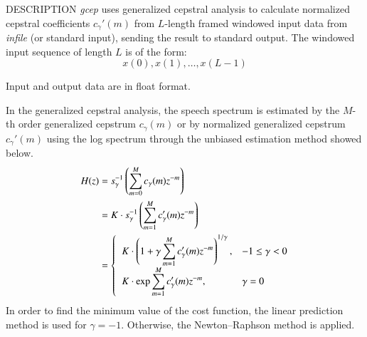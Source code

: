 \begin{synopsis}
\item [gcep] [ --m $M$ ] [ --g $G$ ] [ --c $C$ ] [ --l $L$ ] [ --q $Q$ ] [ --n ]
             [ --i $I$ ] [ --j $J$ ] [ --d $D$ ]
\item [\ ~~~~~~~] [ --e $e$ ] [ --E $E$ ] [ --f $F$ ] [ {\em infile} ]
\end{synopsis}

\begin{qsection}{DESCRIPTION}
{\em gcep} uses generalized cepstral analysis 
to calculate normalized cepstral coefficients $c_\gamma'(m)$ 
from $L$-length framed windowed input data 
from {\em infile} (or standard input), 
sending the result to standard output.
The windowed input sequence of length $L$ is of the form:
\begin{displaymath}
  x(0),x(1),\dots,x(L-1)
\end{displaymath}
\par
Input and output data are in float format.
\par
In the generalized cepstral analysis,
the speech spectrum is estimated by the $M$-th order generalized
cepstrum $c_\gamma(m)$ or by normalized generalized cepstrum 
$c_\gamma'(m)$ using the log spectrum through the unbiased estimation
method showed below.
\begin{align}
H(z) &= s_\gamma^{-1}\left(
        \sum_{m=0}^{M} c_\gamma(m)z^{-m} \right) \notag \\
     &= K \cdot s_\gamma^{-1}\left(
        \sum_{m=1}^{M} c_\gamma'(m)z^{-m} \right) \notag \\
     &= \begin{cases} \;\; \displaystyle
        K\cdot \left( 1+\gamma\sum_{m=1}^{M} c_\gamma'(m)z^{-m}
                \right)^{1/\gamma}, & -1 \leq \gamma < 0 \\
        \;\;\displaystyle K\cdot \exp \sum_{m=1}^{M} c_\gamma'(m)z^{-m}, 
                & \gamma=0
        \end{cases}\notag
\end{align}
In order to find the minimum value of the cost function,
the linear prediction method is used for $\gamma = -1$.
Otherwise, the Newton--Raphson method is applied.
\end{qsection}

